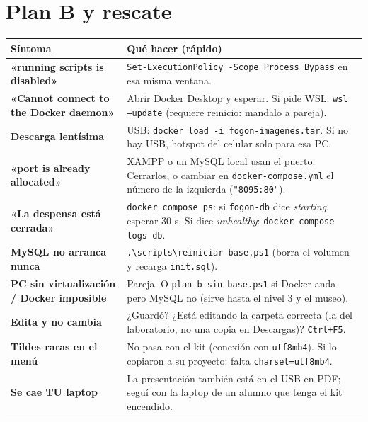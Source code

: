 \documentclass[11pt]{article}
\newcommand{\seccionactual}{GUION DOCENTE · OPERACIÓN FOGÓN}
\begin{document}
\clearpage
\renewcommand{\seccionactual}{PLAN B Y RESCATE}
\section*{Plan B y rescate}

\renewcommand{\arraystretch}{1.4}
\begin{longtable}{>{\raggedright\arraybackslash\bfseries}p{4.6cm} >{\raggedright\arraybackslash}p{11.2cm}}
\toprule
Síntoma & Qué hacer (rápido) \\
\midrule
\endhead
«running scripts is disabled» & \texttt{Set-ExecutionPolicy -Scope Process Bypass} en esa misma ventana. \\
«Cannot connect to the Docker daemon» & Abrir Docker Desktop y esperar. Si pide WSL: \texttt{wsl --update} (requiere reinicio: mandalo a pareja). \\
Descarga lentísima & USB: \texttt{docker load -i fogon-imagenes.tar}. Si no hay USB, hotspot del celular solo para esa PC. \\
«port is already allocated» & XAMPP o un MySQL local usan el puerto. Cerrarlos, o cambiar en \texttt{docker-compose.yml} el número de la izquierda (\texttt{"8095:80"}). \\
«La despensa está cerrada» & \texttt{docker compose ps}: si \texttt{fogon-db} dice \emph{starting}, esperar 30 s. Si dice \emph{unhealthy}: \texttt{docker compose logs db}. \\
MySQL no arranca nunca & \texttt{.\textbackslash scripts\textbackslash reiniciar-base.ps1} (borra el volumen y recarga \texttt{init.sql}). \\
PC sin virtualización / Docker imposible & Pareja. O \texttt{plan-b-sin-base.ps1} si Docker anda pero MySQL no (sirve hasta el nivel 3 y el museo). \\
Edita y no cambia & ¿Guardó? ¿Está editando la carpeta correcta (la del laboratorio, no una copia en Descargas)? \texttt{Ctrl+F5}. \\
Tildes raras en el menú & No pasa con el kit (conexión con \texttt{utf8mb4}). Si lo copiaron a su proyecto: falta \texttt{charset=utf8mb4}. \\
Se cae TU laptop & La presentación también está en el USB en PDF; seguí con la laptop de un alumno que tenga el kit encendido. \\
\bottomrule
\end{longtable}

\renewcommand{\seccionactual}{PREGUNTAS QUE VAN A HACER}
\end{document}
